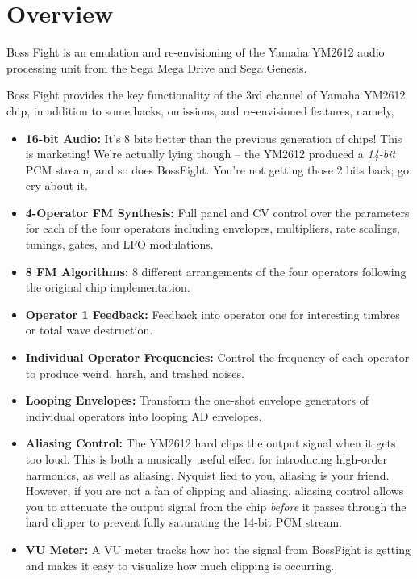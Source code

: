 \documentclass[12pt,a4paper]{article}
\begin{document}


\section{Overview}

Boss Fight is an emulation and re-envisioning of the Yamaha YM2612 audio processing unit from the Sega Mega Drive and Sega Genesis.

Boss Fight provides the key functionality of the 3rd channel of Yamaha YM2612 chip, in addition to some hacks, omissions, and re-envisioned features, namely,
\begin{itemize}
  \item \textbf{16-bit Audio:} It's 8 bits better than the previous generation of chips! This is marketing! We're actually lying though -- the YM2612 produced a \textit{14-bit} PCM stream, and so does BossFight. You're not getting those 2 bits back; go cry about it.
  \item \textbf{4-Operator FM Synthesis:} Full panel and CV control over the parameters for each of the four operators including envelopes, multipliers, rate scalings, tunings, gates, and LFO modulations.
  \item \textbf{8 FM Algorithms:} 8 different arrangements of the four operators following the original chip implementation.
  \item \textbf{Operator 1 Feedback:} Feedback into operator one for interesting timbres or total wave destruction.
  \item \textbf{Individual Operator Frequencies:} Control the frequency of each operator to produce weird, harsh, and trashed noises.
  \item \textbf{Looping Envelopes:} Transform the one-shot envelope generators of individual operators into looping AD envelopes.
  \item \textbf{Aliasing Control:} The YM2612 hard clips the output signal when it gets too loud. This is both a musically useful effect for introducing high-order harmonics, as well as aliasing. Nyquist lied to you, aliasing is your friend. However, if you are not a fan of clipping and aliasing, aliasing control allows you to attenuate the output signal from the chip \textit{before} it passes through the hard clipper to prevent fully saturating the 14-bit PCM stream.
  \item \textbf{VU Meter:} A VU meter tracks how hot the signal from BossFight is getting and makes it easy to visualize how much clipping is occurring.

\end{itemize}
\end{document}
